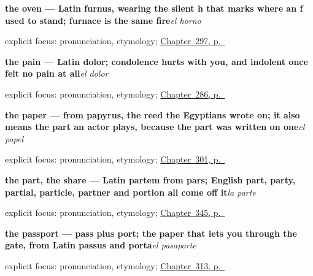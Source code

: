 \noindent\begin{minipage}[t]{\linewidth}
\raggedright
\textbf{the oven — Latin furnus, wearing the silent h that marks where an f used to stand; furnace is the same fire}\enspace\emph{el horno}\par
\footnotesize explicit focus: pronunciation, etymology; \hyperref[ch:la-cocina]{Chapter~297, p.~\pageref*{ch:la-cocina}}
\end{minipage}\par\smallskip

\noindent\begin{minipage}[t]{\linewidth}
\raggedright
\textbf{the pain — Latin dolor; condolence hurts with you, and indolent once felt no pain at all}\enspace\emph{el dolor}\par
\footnotesize explicit focus: pronunciation, etymology; \hyperref[ch:donde-duele]{Chapter~286, p.~\pageref*{ch:donde-duele}}
\end{minipage}\par\smallskip

\noindent\begin{minipage}[t]{\linewidth}
\raggedright
\textbf{the paper — from papyrus, the reed the Egyptians wrote on; it also means the part an actor plays, because the part was written on one}\enspace\emph{el papel}\par
\footnotesize explicit focus: pronunciation, etymology; \hyperref[ch:mas-cosas-que-pedir]{Chapter~301, p.~\pageref*{ch:mas-cosas-que-pedir}}
\end{minipage}\par\smallskip

\noindent\begin{minipage}[t]{\linewidth}
\raggedright
\textbf{the part, the share — Latin partem from pars; English part, party, partial, particle, partner and portion all come off it}\enspace\emph{la parte}\par
\footnotesize explicit focus: pronunciation, etymology; \hyperref[ch:cada-y-mismo]{Chapter~345, p.~\pageref*{ch:cada-y-mismo}}
\end{minipage}\par\smallskip

\noindent\begin{minipage}[t]{\linewidth}
\raggedright
\textbf{the passport — pass plus port; the paper that lets you through the gate, from Latin passus and porta}\enspace\emph{el pasaporte}\par
\footnotesize explicit focus: pronunciation, etymology; \hyperref[ch:el-mostrador]{Chapter~313, p.~\pageref*{ch:el-mostrador}}
\end{minipage}\par\smallskip

